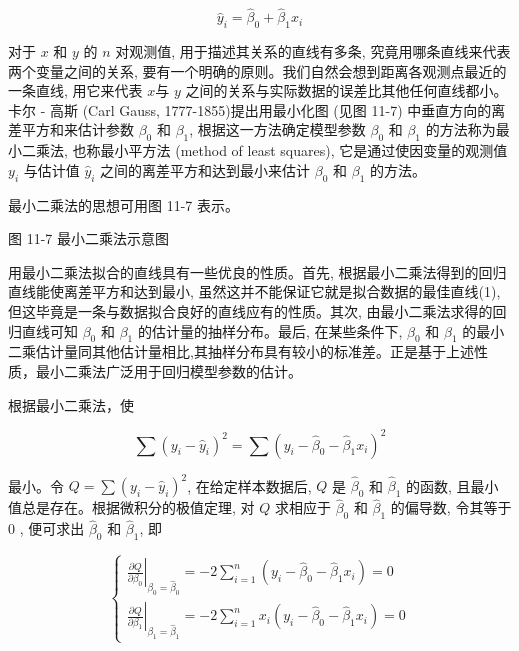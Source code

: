 \documentclass[10pt]{article}
\begin{document}
\begin{CJK*}{UTF8}{bsmi}
\begin{equation*}
\hat{y}_{i}=\hat{\beta}_{0}+\hat{\beta}_{1} x_{i} \tag{11.6}
\end{equation*}


对于 $x$ 和 $y$ 的 $n$ 对观测值, 用于描述其关系的直线有多条, 究竟用哪条直线来代表两个变量之间的关系, 要有一个明确的原则。我们自然会想到距离各观测点最近的一条直线, 用它来代表 $x$与 $y$ 之间的关系与实际数据的误差比其他任何直线都小。卡尔 - 高斯 (Carl Gauss, 1777-1855)提出用最小化图 (见图 11-7) 中垂直方向的离差平方和来估计参数 $\beta_{0}$ 和 $\beta_{1}$, 根据这一方法确定模型参数 $\beta_{0}$ 和 $\beta_{1}$ 的方法称为最小二乘法, 也称最小平方法 (method of least squares), 它是通过使因变量的观测值 $y_{i}$ 与估计值 $\hat{y}_{i}$ 之间的离差平方和达到最小来估计 $\beta_{0}$ 和 $\beta_{1}$ 的方法。

最小二乘法的思想可用图 11-7 表示。

\begin{center}
\end{center}

图 11-7 最小二乘法示意图

用最小二乘法拟合的直线具有一些优良的性质。首先, 根据最小二乘法得到的回归直线能使离差平方和达到最小, 虽然这并不能保证它就是拟合数据的最佳直线(1), 但这毕竟是一条与数据拟合良好的直线应有的性质。其次, 由最小二乘法求得的回归直线可知 $\beta_{0}$ 和 $\beta_{1}$ 的估计量的抽样分布。最后, 在某些条件下, $\beta_{0}$ 和 $\beta_{1}$ 的最小二乘估计量同其他估计量相比,其抽样分布具有较小的标准差。正是基于上述性质，最小二乘法广泛用于回归模型参数的估计。

根据最小二乘法，使


\begin{equation*}
\sum\left(y_{i}-\hat{y}_{i}\right)^{2}=\sum\left(y_{i}-\hat{\beta}_{0}-\hat{\beta}_{1} x_{i}\right)^{2} \tag{11.7}
\end{equation*}


最小。令 $Q=\sum\left(y_{i}-\hat{y}_{i}\right)^{2}$, 在给定样本数据后, $Q$ 是 $\hat{\beta}_{0}$ 和 $\hat{\beta}_{1}$ 的函数, 且最小值总是存在。根据微积分的极值定理, 对 $Q$ 求相应于 $\hat{\beta}_{0}$ 和 $\hat{\beta}_{1}$ 的偏导数, 令其等于 0 , 便可求出 $\hat{\beta}_{0}$ 和 $\hat{\beta}_{1}$, 即

\[
\left\{\begin{array}{l}
\left.\frac{\partial Q}{\partial \beta_{0}}\right|_{\beta_{0}=\hat{\beta}_{0}}=-2 \sum_{i=1}^{n}\left(y_{i}-\hat{\beta}_{0}-\hat{\beta}_{1} x_{i}\right)=0  \tag{11.8}\\
\left.\frac{\partial Q}{\partial \beta_{1}}\right|_{\beta_{1}=\hat{\beta}_{1}}=-2 \sum_{i=1}^{n} x_{i}\left(y_{i}-\hat{\beta}_{0}-\hat{\beta}_{1} x_{i}\right)=0
\end{array}\right.
\]


\end{CJK*}
\end{document}
